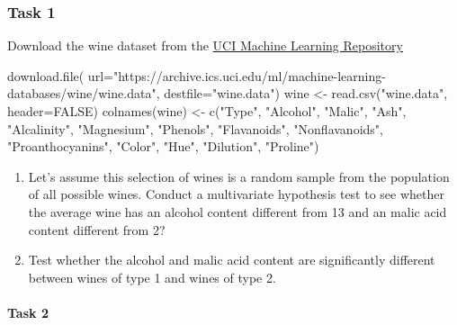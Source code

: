 \documentclass[
]{book}
\newenvironment{Shaded}{\begin{snugshade}}{\end{snugshade}}
\newcommand{\AttributeTok}[1]{\textcolor[rgb]{0.77,0.63,0.00}{#1}}
\newcommand{\ConstantTok}[1]{\textcolor[rgb]{0.00,0.00,0.00}{#1}}
\newcommand{\FunctionTok}[1]{\textcolor[rgb]{0.00,0.00,0.00}{#1}}
\newcommand{\NormalTok}[1]{#1}
\newcommand{\OtherTok}[1]{\textcolor[rgb]{0.56,0.35,0.01}{#1}}
\newcommand{\StringTok}[1]{\textcolor[rgb]{0.31,0.60,0.02}{#1}}
\theoremstyle{definition}
\theoremstyle{definition}
\theoremstyle{definition}
\theoremstyle{definition}
\theoremstyle{remark}
\begin{document}
\hypertarget{task-1-2}{%
\subsubsection*{Task 1}\label{task-1-2}}

Download the wine dataset from the \href{https://archive.ics.uci.edu/ml/datasets/wine}{UCI Machine Learning Repository}

\begin{Shaded}
\begin{Highlighting}[]
\FunctionTok{download.file}\NormalTok{(}
  \AttributeTok{url=}\StringTok{"https://archive.ics.uci.edu/ml/machine{-}learning{-}databases/wine/wine.data"}\NormalTok{, }
              \AttributeTok{destfile=}\StringTok{"wine.data"}\NormalTok{)}
\NormalTok{wine }\OtherTok{\textless{}{-}} \FunctionTok{read.csv}\NormalTok{(}\StringTok{"wine.data"}\NormalTok{, }\AttributeTok{header=}\ConstantTok{FALSE}\NormalTok{)}
\FunctionTok{colnames}\NormalTok{(wine) }\OtherTok{\textless{}{-}} \FunctionTok{c}\NormalTok{(}\StringTok{"Type"}\NormalTok{, }\StringTok{"Alcohol"}\NormalTok{, }\StringTok{"Malic"}\NormalTok{,}
\StringTok{"Ash"}\NormalTok{,}
\StringTok{"Alcalinity"}\NormalTok{,}
\StringTok{"Magnesium"}\NormalTok{,}
\StringTok{"Phenols"}\NormalTok{,}
\StringTok{"Flavanoids"}\NormalTok{,}
\StringTok{"Nonflavanoids"}\NormalTok{,}
\StringTok{"Proanthocyanins"}\NormalTok{,}
\StringTok{"Color"}\NormalTok{,}
\StringTok{"Hue"}\NormalTok{,}
\StringTok{"Dilution"}\NormalTok{,}
\StringTok{"Proline"}\NormalTok{)}
\end{Highlighting}
\end{Shaded}

\begin{enumerate}
\def\labelenumi{\roman{enumi}.}
\item
  Let's assume this selection of wines is a random sample from the population of all possible wines. Conduct a multivariate hypothesis test to see whether the average wine has an alcohol content different from 13 and an malic acid content different from 2?
\item
  Test whether the alcohol and malic acid content are significantly different between wines of type 1 and wines of type 2.
\end{enumerate}

\hypertarget{task-2-2}{%
\paragraph*{Task 2}\label{task-2-2}}
\end{document}
